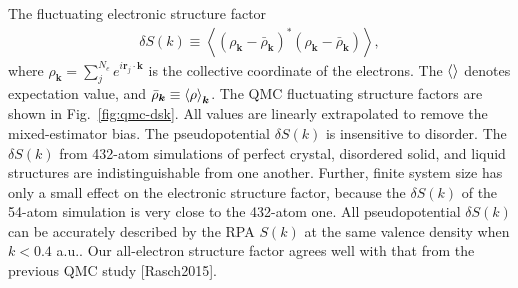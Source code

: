 \documentclass[aps,prl,superscriptaddress]{revtex4-1}
\newcommand{\bs}{\boldsymbol}
\begin{document}
The fluctuating electronic structure factor
\begin{align}
\delta S(k) \equiv \left\langle
(\rho_{\bs{k}}-\bar{\rho}_{\bs{k}})^* (\rho_{\bs{k}}-\bar{\rho}_{\bs{k}})
\right\rangle,
\end{align}
where $\rho_{\bs{k}} = \sum\limits_j^{N_e} e^{i\bs{r}_j\cdot\bs{k}}$ is the collective coordinate of the electrons. The $\braket{}$ denotes expectation value, and $\bar{\rho}_{\bs{k}}\equiv\braket{\rho}_{\bs{k}}$. The QMC fluctuating structure factors are shown in Fig.~\ref{fig:qmc-dsk}. All values are linearly extrapolated to remove the mixed-estimator bias. The pseudopotential $\delta S(k)$ is insensitive to disorder. The $\delta S(k)$ from 432-atom simulations of perfect crystal, disordered solid, and liquid structures are indistinguishable from one another. Further, finite system size has only a small effect on the electronic structure factor, because the $\delta S(k)$ of the 54-atom simulation is very close to the 432-atom one. All pseudopotential $\delta S(k)$ can be accurately described by the RPA $S(k)$ at the same valence density when $k<0.4$ a.u.. Our all-electron structure factor agrees well with that from the previous QMC study [Rasch2015].
\end{document}
